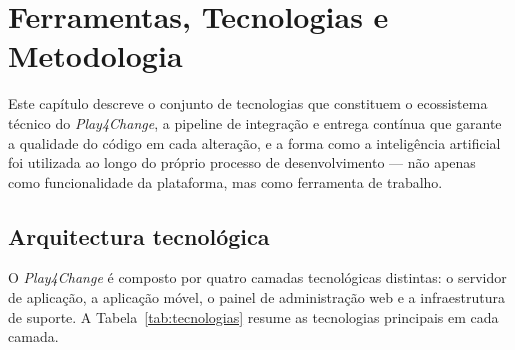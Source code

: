 %
%
\chapter{Ferramentas, Tecnologias e Metodologia}
\label{cha:ferramentas}

Este capítulo descreve o conjunto de tecnologias que constituem o ecossistema técnico do \emph{Play4Change}, a pipeline de integração e entrega contínua que garante a qualidade do código em cada alteração, e a forma como a inteligência artificial foi utilizada ao longo do próprio processo de desenvolvimento --- não apenas como funcionalidade da plataforma, mas como ferramenta de trabalho.

\section{Arquitectura tecnológica}
\label{sec:tecnologias}

O \emph{Play4Change} é composto por quatro camadas tecnológicas distintas: o servidor de aplicação, a aplicação móvel, o painel de administração web e a infraestrutura de suporte. A Tabela~\ref{tab:tecnologias} resume as tecnologias principais em cada camada.

